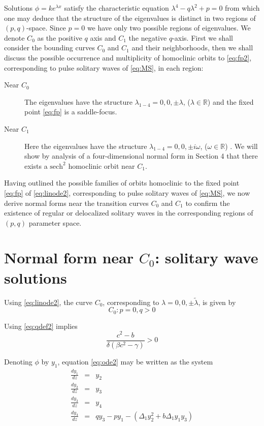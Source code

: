 Solutions $\phi = k e^{\lambda x}$ satisfy the characteristic equation
$\lambda^4 - q \lambda^2 + p = 0 $ from which one may deduce that the structure
of the eigenvalues is distinct in two regions of $\left(p,q\right)$-space.
Since $p=0$ we have only two possible regions of eigenvalues.  We denote $C_0$
as the positive $q$ axis and $C_1$ the negative $q$-axis. First we shall 
consider the bounding curves $C_0$ and $C_1$ and their neighborhoods, then we shall discuss the possible
occurrence and multiplicity of homoclinic orbits to \eqref{eq:fp2}, corresponding
to pulse solitary waves of \eqref{eq:MS}, in each region:

\begin{description}
\item[Near $C_0$] 
The eigenvalues have the structure $\lambda_{1-4} = 0,0,\pm \lambda$, ($\lambda \in \mathbb{R}$) and the fixed point
\eqref{eq:fp} is a saddle-focus.
\item[Near $C_1$] 
Here the eigenvalues have the structure $\lambda_{1-4} = 0,0,\pm i \omega $, ($\omega \in \mathbb{R}$) . We will show by analysis of a
four-dimensional normal form in Section 4 that there exists a $\mathrm{sech}^2$ homoclinic orbit near $C_1$.
\end{description}

Having outlined the possible families of orbits homoclinic to the fixed point \eqref{eq:fp} of \eqref{eq:linode2},
corresponding to pulse solitary waves of \eqref{eq:MS}, we now derive normal forms near the transition curves $C_0$ and $C_1$
to confirm the existence of regular or delocalized solitary waves in the corresponding regions of $\left(p,q\right)$ parameter space.

\section{Normal form near $C_0$: solitary wave solutions}

Using \eqref{eq:linode2}, the curve $C_0$, corresponding to $\lambda = 0,0,\pm \tilde{ \lambda } $, is given by
\begin{equation}
C_0: { p=0, q > 0 }
\end{equation}

Using \eqref{eq:qdef2} implies
\begin{equation}
 \frac{c^2 - b}{\delta\left(\beta c^2 - \gamma\right)} > 0
\end{equation}

Denoting $\phi$ by $y_1$, equation \eqref{eq:ode2} may be written as the system
\begin{subequations}\label{eq:system2}
\begin{eqnarray}
\frac{d y_1 }{d z} &=& y_2 \\
\frac{d y_2 }{d z} &=& y_3 \\
\frac{d y_3 }{d z} &=& y_4 \\
\frac{d y_4 }{d z} &=& q y_3 - p y_1 - \left(\Delta_1 y_2^2 + b \Delta_1 y_1 y_3 \right)
\end{eqnarray}
\end{subequations}

